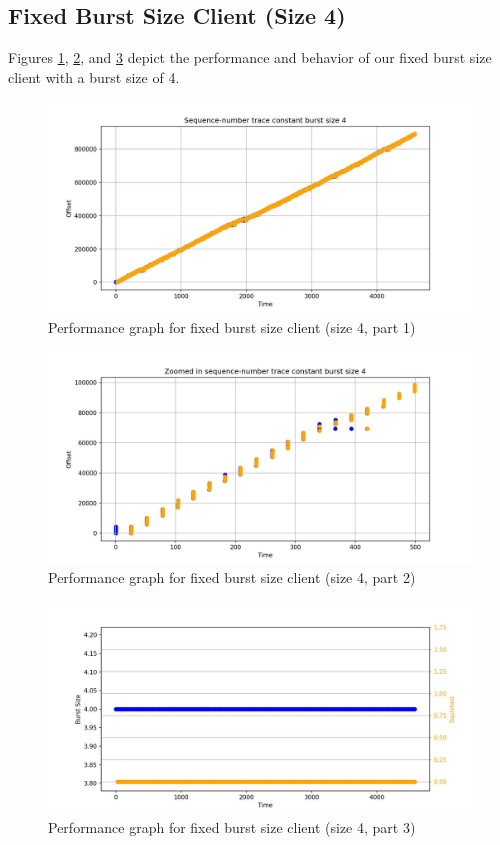 \documentclass[12pt]{article}
\begin{document}
\clearpage
\subsection{Fixed Burst Size Client (Size 4)}

Figures \ref{fig:fixed4_1}, \ref{fig:fixed4_2}, and \ref{fig:fixed4_3} depict the performance and behavior of our fixed burst size client with a burst size of 4.

\begin{figure}[h]
    \centering
    \includegraphics[width=0.7\linewidth]{constant burst size 4_1.jpeg}
    \caption{Performance graph for fixed burst size client (size 4, part 1)}
    \label{fig:fixed4_1}
\end{figure}

\begin{figure}[h]
    \centering
    \includegraphics[width=0.7\linewidth]{constant burst size 4_2.jpeg}
    \caption{Performance graph for fixed burst size client (size 4, part 2)}
    \label{fig:fixed4_2}
\end{figure}

\begin{figure}[h]
    \centering
    \includegraphics[width=0.7\linewidth]{constant burst size 4_3.jpeg}
    \caption{Performance graph for fixed burst size client (size 4, part 3)}
    \label{fig:fixed4_3}
\end{figure}
\end{document}
